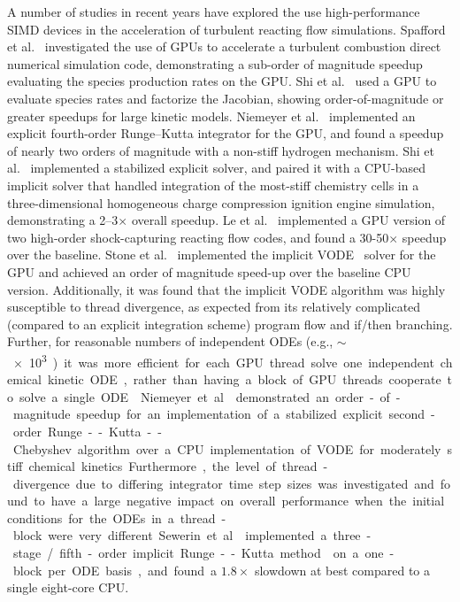\documentclass[preprint]{elsarticle}
\begin{document}
A number of studies in recent years have explored the use high-performance SIMD devices in the acceleration of turbulent reacting flow simulations.
Spafford et al.~\cite{Spafford:2010aa} investigated the use of GPUs to accelerate a turbulent combustion direct numerical simulation code, demonstrating a sub-order of magnitude speedup evaluating the species production rates on the GPU.
Shi et al.~\cite{Shi:2011aa} used a GPU to evaluate species rates and factorize the Jacobian, showing order-of-magnitude or greater speedups for large kinetic models.
Niemeyer et al.~\cite{Niemeyer:2011aa} implemented an explicit fourth-order Runge--Kutta integrator for the GPU, and found a speedup of nearly two orders of magnitude with a non-stiff hydrogen mechanism.
Shi et al.~\cite{Shi:2012aa} implemented a stabilized explicit solver, and paired it with a CPU-based implicit solver that handled integration of the most-stiff chemistry cells in a three-dimensional homogeneous charge compression ignition engine simulation, demonstrating a 2--3$\times$ overall speedup.
Le et al.~\cite{Le2013596} implemented a GPU version of two high-order shock-capturing reacting flow codes, and found a 30-50$\times$ speedup over the baseline.
Stone et al.~\cite{Stone:2013aa} implemented the implicit VODE~\cite{brown1989vode} solver for the GPU and achieved an order of magnitude speed-up over the baseline CPU version.
Additionally, it was found that the implicit VODE algorithm was highly susceptible to thread divergence, as expected from its relatively complicated (compared to an explicit integration scheme) program flow and if/then branching.
Further, for reasonable numbers of independent ODEs (e.g., $\sim$\SI{e3}) it was more efficient for each GPU thread solve one independent chemical kinetic ODE, rather than having a block of GPU threads cooperate to solve a single ODE~\cite{Stone:2013aa}.
Niemeyer et al.~\cite{Niemeyer:2014aa} demonstrated an order-of-magnitude speedup for an implementation of a stabilized explicit second-order Runge--Kutta--Chebyshev algorithm over a CPU implementation of VODE for moderately stiff chemical kinetics.
Furthermore, the level of thread-divergence due to differing integrator time step sizes was investigated and found to have a large negative impact on overall performance when the initial conditions for the ODEs in a thread-block were very different.
Sewerin et al.~\cite{Sewerin20151375} implemented a three-stage\slash fifth-order implicit Runge--Kutta method~\cite{hairer1996solving} on a one-block per ODE basis, and found a $\SI{1.8}\times$ slowdown at best compared to a single eight-core CPU.
\end{document}
